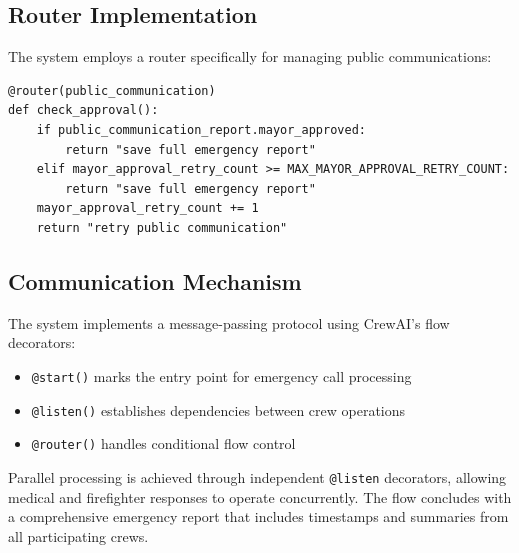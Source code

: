 \subsection{Router Implementation}
The system employs a router specifically for managing public communications:
\begin{lstlisting}[caption={Router Implementation for Public Communication Approval}]
@router(public_communication)
def check_approval():
    if public_communication_report.mayor_approved:
        return "save full emergency report"
    elif mayor_approval_retry_count >= MAX_MAYOR_APPROVAL_RETRY_COUNT:
        return "save full emergency report"
    mayor_approval_retry_count += 1
    return "retry public communication"
\end{lstlisting}

\subsection{Communication Mechanism}
The system implements a message-passing protocol using CrewAI's flow decorators:
\begin{itemize}
    \item \texttt{@start()} marks the entry point for emergency call processing
    \item \texttt{@listen()} establishes dependencies between crew operations
    \item \texttt{@router()} handles conditional flow control
\end{itemize}

Parallel processing is achieved through independent \texttt{@listen} decorators, allowing medical and firefighter responses to operate concurrently. The flow concludes with a comprehensive emergency report that includes timestamps and summaries from all participating crews.